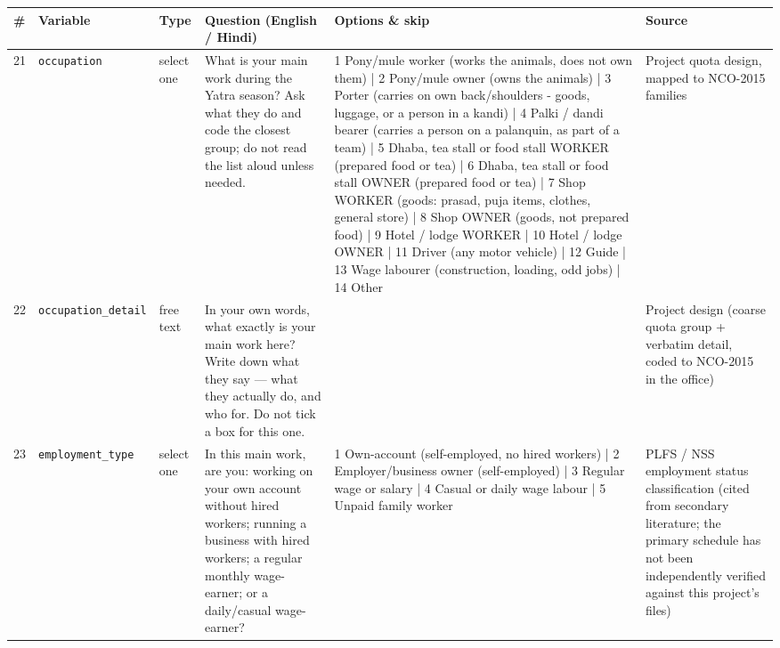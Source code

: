 \documentclass[9pt,a4paper,landscape]{article}
\begin{document}
\begin{longtable}{@{}p{0.5cm}p{3.3cm}p{1.7cm}p{7.3cm}p{5.6cm}p{5.4cm}@{}}
\toprule \footnotesize\textbf{\#} & \footnotesize\textbf{Variable} & \footnotesize\textbf{Type} & \footnotesize\textbf{Question (English / Hindi)} & \footnotesize\textbf{Options {\&} skip} & \footnotesize\textbf{Source}\\ \midrule
\endhead
\footnotesize 21 & \footnotesize\texttt{occupation} & \scriptsize select one & \footnotesize What is your main work during the Yatra season? Ask what they do and code the closest group; do not read the list aloud unless needed.\par\vspace{1pt}{\footnotesize\color{hdr}{\hifont यात्रा के मौसम में आपका मुख्य काम क्या है?}} & \scriptsize 1 Pony/mule worker (works the animals, does not own them) | 2 Pony/mule owner (owns the animals) | 3 Porter (carries on own back/shoulders - goods, luggage, or a person in a kandi) | 4 Palki / dandi bearer (carries a person on a palanquin, as part of a team) | 5 Dhaba, tea stall or food stall WORKER (prepared food or tea) | 6 Dhaba, tea stall or food stall OWNER (prepared food or tea) | 7 Shop WORKER (goods: prasad, puja items, clothes, general store) | 8 Shop OWNER (goods, not prepared food) | 9 Hotel / lodge WORKER | 10 Hotel / lodge OWNER | 11 Driver (any motor vehicle) | 12 Guide | 13 Wage labourer (construction, loading, odd jobs) | 14 Other & \scriptsize Project quota design, mapped to NCO-2015 families\\
\footnotesize 22 & \footnotesize\texttt{occupation\_detail} & \scriptsize free text & \footnotesize In your own words, what exactly is your main work here? Write down what they say — what they actually do, and who for. Do not tick a box for this one.\par\vspace{1pt}{\footnotesize\color{hdr}{\hifont अपने शब्दों में बताइए, यहाँ आपका मुख्य काम ठीक-ठीक क्या है? आप करते क्या हैं, और किसके लिए?}} & \scriptsize  & \scriptsize Project design (coarse quota group + verbatim detail, coded to NCO-2015 in the office)\\
\footnotesize 23 & \footnotesize\texttt{employment\_type} & \scriptsize select one & \footnotesize In this main work, are you: working on your own account without hired workers; running a business with hired workers; a regular monthly wage-earner; or a daily/casual wage-earner?\par\vspace{1pt}{\footnotesize\color{hdr}{\hifont इस काम में आप क्या हैं: अपना काम खुद करते हैं और कोई नौकर नहीं रखते; अपना काम है और दूसरों को काम पर रखते हैं; महीने की पक्की तनख़्वाह पाते हैं; या दिहाड़ी पर काम करते हैं?}} & \scriptsize 1 Own-account (self-employed, no hired workers) | 2 Employer/business owner (self-employed) | 3 Regular wage or salary | 4 Casual or daily wage labour | 5 Unpaid family worker & \scriptsize PLFS / NSS employment status classification (cited from secondary literature; the primary schedule has not been independently verified against this project's files)\\

\end{longtable}
\end{document}
